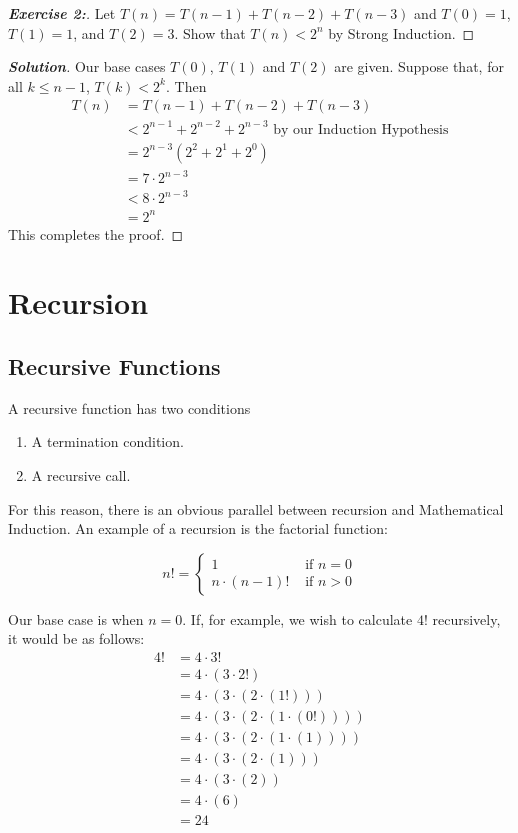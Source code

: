 \documentclass[a4paper]{article}
\newenvironment{solution}{\begin{proof}[\textnormal{\textbf{Solution}}]}{\end{proof}}
\newenvironment{exercise}[1]{\begin{proof}[\textnormal{\textbf{Exercise #1:}}]\phantom{\qedhere}}{\end{proof}}
\theoremstyle{definition}
\begin{document}
 \begin{exercise}{2}
  Let $T(n) = T(n-1) + T(n-2) + T(n-3)$ and $T(0)=1$, $T(1)=1$, and $T(2)=3$. Show that $T(n)<2^n$ by Strong Induction.
 \end{exercise}
 \begin{solution}
  Our base cases $T(0)$, $T(1)$ and $T(2)$ are given. Suppose that, for all $k\leq n-1$, $T(k)<2^k$. Then 
  \begin{align*}
  T(n)&=T(n-1)+T(n-2)+T(n-3)\\
      &<2^{n-1}+2^{n-2}+2^{n-3}\text{ by our Induction Hypothesis}\\
      &=2^{n-3}(2^2+2^1+2^0)\\
      &=7\cdot2^{n-3}\\
      &<8\cdot2^{n-3}\\
      &=2^n
  \end{align*}
This completes the proof.
 \end{solution}

\section{Recursion}
\subsection{Recursive Functions}
A recursive function has two conditions
\begin{enumerate}
 \item A termination condition.
 \item A recursive call.
\end{enumerate}

For this reason, there is an obvious parallel between recursion and Mathematical Induction. An example of a recursion is the factorial function:

\[n! = \begin{cases} 
       1 & \text{ if }n=0 \\
       n\cdot(n-1)! & \text{ if } n>0
   \end{cases}\]

Our base case is when $n=0$. If, for example, we wish to calculate $4!$ recursively, it would be as follows:
\begin{align*}4!&=4\cdot3!\\&=4\cdot(3\cdot2!)\\&=4\cdot(3\cdot(2\cdot(1!)))\\&=4\cdot(3\cdot(2\cdot(1\cdot(0!))))\\&=4\cdot(3\cdot(2\cdot(1\cdot(1))))\\&=4\cdot(3\cdot(2\cdot(1)))\\&=4\cdot(3\cdot(2))\\&=4\cdot(6)\\&=24\end{align*}
\end{document}
